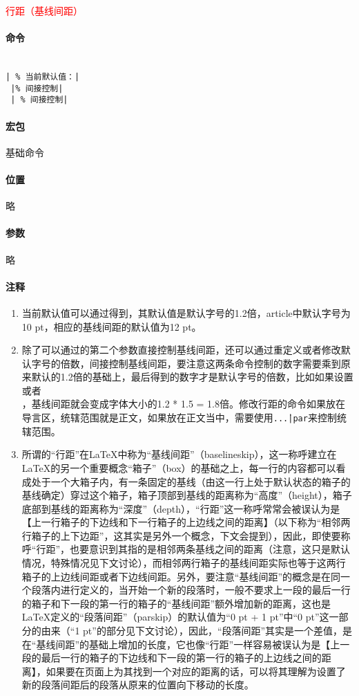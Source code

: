 \documentclass{article}
\newcommand{\mnt}[1]{\texttt{#1}} %
\newcommand{\notes}[6]{
    \begin{mdframed}
        {\begin{center}\large\textcolor{red}{#1}\end{center}}
        \paragraph{命令}~\vspace{10pt}\\#2
        \paragraph{宏包}#3
        \paragraph{位置}#4
        \paragraph{参数}#5
        \paragraph{注释}#6
    \end{mdframed}
}
\begin{document}
\notes
{行距（基线间距）}%
{
    \mnt{\baselineskip |~\% 当前默认值：\the\baselineskip|}\\
    \mnt{\renewcommand{\baselinestretch}{1.5} |\% 间接控制|\baselineskip}\\
    \mnt{\linespread{1.5} |~\% 间接控制|\baselineskip}
}%
{基础命令}%
{略}%
{略}%
{
    \begin{enumerate}
        \item 当前默认值可以通过\mnt{\the\baselineskip}得到，其默认值是默认字号的1.2倍，article中默认字号为10 pt，相应的基线间距的默认值为12 pt。
        \item 除了可以通过\mnt{\fontsize{}{}}的第二个参数直接控制基线间距，还可以通过重定义\mnt{\baselinestretch}或者\mnt{\linespread{}}修改默认字号的倍数，间接控制基线间距，要注意这两条命令控制的数字需要乘到原来默认的1.2倍的基础上，最后得到的数字才是默认字号的倍数，比如如果设置\mnt{\renewcommand{\baselinestretch}{1.5}}或者\\\mnt{\linespread{1.5}}，基线间距就会变成字体大小的1.2 * 1.5 = 1.8倍。修改行距的命令如果放在导言区，统辖范围就是正文，如果放在正文当中，需要使用\mnt{{\selectfont...\|\mbox{}|par}}来控制统辖范围。
        \item 所谓的“行距”在\LaTeX{}中称为“基线间距”（baselineskip），这一称呼建立在\LaTeX{}的另一个重要概念“箱子”（box）的基础之上，每一行的内容都可以看成处于一个大箱子内，有一条固定的基线（由这一行上处于默认状态的箱子的基线确定）穿过这个箱子，箱子顶部到基线的距离称为“高度”（height），箱子底部到基线的距离称为“深度”（depth），“行距”这一称呼常常会被误认为是【上一行箱子的下边线和下一行箱子的上边线之间的距离】（以下称为“相邻两行箱子的上下边距”，这其实是另外一个概念，下文会提到），因此，即使要称呼“行距”，也要意识到其指的是相邻两条基线之间的距离（注意，这只是默认情况，特殊情况见下文讨论），而相邻两行箱子的基线间距实际也等于这两行箱子的上边线间距或者下边线间距。另外，要注意“基线间距”的概念是在同一个段落内进行定义的，当开始一个新的段落时，一般不要求上一段的最后一行的箱子和下一段的第一行的箱子的“基线间距”额外增加新的距离，这也是\LaTeX{}定义的“段落间距”（parskip）的默认值为“0 pt + 1 pt”中“0 pt”这一部分的由来（“1 pt”的部分见下文讨论），因此，“段落间距\mnt{\parskip}”其实是一个差值，是在“基线间距”的基础上增加的长度，它也像“行距”一样容易被误认为是【上一段的最后一行的箱子的下边线和下一段的第一行的箱子的上边线之间的距离】，如果要在页面上为其找到一个对应的距离的话，可以将其理解为设置了新的段落间距后的段落从原来的位置向下移动的长度。
        

\end{enumerate}}
\end{document}
